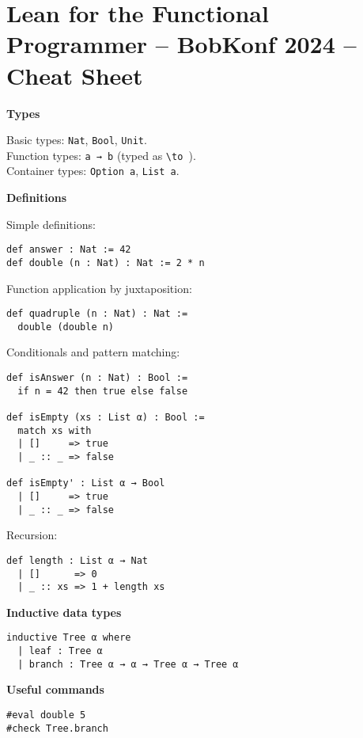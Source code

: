 \documentclass[11pt,DIV=16,parskip=half,headings=normal,abstract]{scrartcl}
\newcommand{\li}{\lstinline}
\begin{document}
\thispagestyle{empty}

\section*{Lean for the Functional Programmer -- BobKonf 2024 -- Cheat Sheet}

\setlength\columnsep{5mm}
\begin{multicols*}{2}
\raggedright
\raggedcolumns

\textbf{Types}

Basic types: \li{Nat}, \li{Bool}, \li{Unit}.\\
Function types: \li{a → b} (typed as \li{\to }).\\
Container types: \li{Option a}, \li{List a}.

\textbf{Definitions}

Simple definitions:
\begin{lstlisting}
def answer : Nat := 42
def double (n : Nat) : Nat := 2 * n
\end{lstlisting}

Function application by juxtaposition:
\begin{lstlisting}
def quadruple (n : Nat) : Nat :=
  double (double n)
\end{lstlisting}

Conditionals and pattern matching:
\begin{lstlisting}
def isAnswer (n : Nat) : Bool :=
  if n = 42 then true else false

def isEmpty (xs : List α) : Bool :=
  match xs with
  | []     => true
  | _ :: _ => false

def isEmpty' : List α → Bool
  | []     => true
  | _ :: _ => false
\end{lstlisting}

Recursion:
\begin{lstlisting}
def length : List α → Nat
  | []      => 0
  | _ :: xs => 1 + length xs
\end{lstlisting}

\textbf{Inductive data types}

\begin{lstlisting}
inductive Tree α where
  | leaf : Tree α
  | branch : Tree α → α → Tree α → Tree α
\end{lstlisting}

\textbf{Useful commands}
\begin{lstlisting}
#eval double 5
#check Tree.branch
\end{lstlisting}


\end{multicols*}
\end{document}
